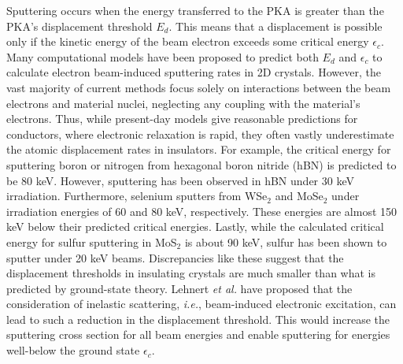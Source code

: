 \documentclass{article}
\begin{document}
Sputtering occurs when the energy transferred to the PKA is greater than
the PKA's displacement threshold $E_d$.
This means that a displacement is possible only if the kinetic energy of the
beam electron exceeds some critical energy $\epsilon_c$.
Many computational models have been proposed to predict both $E_d$ and
$\epsilon_c$ to calculate electron beam-induced sputtering rates in 2D
crystals.\cite{Meyer2012, Susi2016, Yoshimura2018, Susi2019}
However, the vast majority of current methods focus solely on interactions
between the beam electrons and material nuclei, neglecting any coupling with
the material's electrons.
Thus, while present-day models give reasonable predictions for
conductors,\cite{Meyer2012} where electronic relaxation is rapid, they often
vastly underestimate the atomic displacement rates in insulators.
For example, the critical energy for sputtering boron or nitrogen from
hexagonal boron nitride (hBN) is predicted to be 80 keV.\cite{Kotakoski2010}
However, sputtering has been observed in hBN under 30 keV
irradiation.\cite{Cretu2015}
Furthermore, selenium sputters from WSe$_2$ and MoSe$_2$ under irradiation
energies of 60 and 80 keV, respectively.  These energies are almost 150 keV
below their predicted critical energies.\cite{Lin2015, Lehnert2017}
Lastly, while the calculated critical energy for sulfur sputtering in MoS$_2$
is about 90 keV, sulfur has been shown to sputter under 20 keV
beams.\cite{Kretschmer2020}
Discrepancies like these suggest that the displacement thresholds in insulating
crystals are much smaller than what is predicted by ground-state theory.
Lehnert \textit{et al.}  have proposed that the consideration of inelastic scattering,
\textit{i.e.}, beam-induced electronic excitation, can lead to such a reduction in the
displacement threshold.\cite{Lehnert2017}
This would increase the sputtering cross section for all beam energies and
enable sputtering for energies well-below the ground state $\epsilon_c$.
\end{document}
